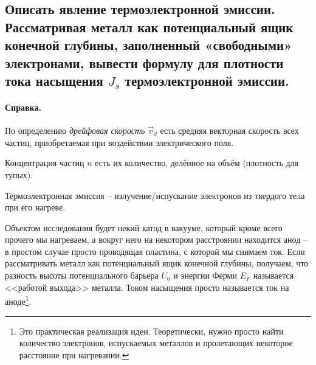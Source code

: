 \subsection{Описать явление термоэлектронной эмиссии. Рассматривая металл как потенциальный
ящик конечной глубины, заполненный «свободными» электронами, вывести формулу для плотности
тока насыщения $J_s$ термоэлектронной эмиссии.}
\label{sec:w7}
{\footnotesize \paragraph{\footnotesize Справка.} По определению \emph{дрейфовая
скорость} $ \vec v_d $ есть средняя векторная скорость всех частиц,
приобретаемая при воздействии электрического поля.

Концентрация частиц $ n $ есть их количество, делённое на объём (плотность для
тупых).
}

Термоэлектронная эмиссия -- излучение/испускание электронов из твердого тела при его нагреве.

Объектом исследования будет некий катод в вакууме, который кроме всего прочего мы нагреваем,
а вокруг него на некотором расстроянии находится анод -- в простом случае просто проводящая
пластина, с которой мы снимаем ток. Если рассматривать металл как потенциальный ящик конечной
глубины, получаем, что разность высоты потенциального барьера $U_0$ и энергии
Ферми $ E_F $ называется <<работой выхода>>
металла.
Током насыщения просто называется ток на аноде\footnote{Это практическая
  реализация идеи. Теоретически, нужно просто найти количество электронов,
испускаемых металлов и пролетающих некоторое расстояние при нагревании.}.

